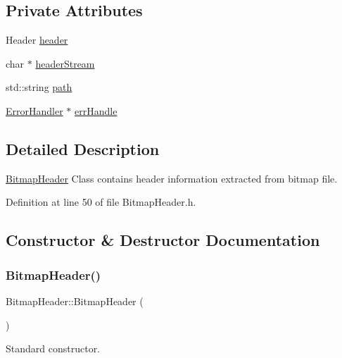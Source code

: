 \subsection*{Private Attributes}
\begin{DoxyCompactItemize}
\item 
Header \mbox{\hyperlink{classBitmapHeader_ab1e2a2c32e87d647977bbd3e700f2265}{header}}
\item 
char $\ast$ \mbox{\hyperlink{classBitmapHeader_a9109a897251733f77942008318482426}{header\+Stream}}
\item 
std\+::string \mbox{\hyperlink{classBitmapHeader_a928111fbaf59eebf24b750cbca11c5dd}{path}}
\item 
\mbox{\hyperlink{classErrorHandler}{Error\+Handler}} $\ast$ \mbox{\hyperlink{classBitmapHeader_ab06f141245d592302dabe48571d12e32}{err\+Handle}}
\end{DoxyCompactItemize}


\subsection{Detailed Description}
\mbox{\hyperlink{classBitmapHeader}{Bitmap\+Header}} Class contains header information extracted from bitmap file. 

Definition at line 50 of file Bitmap\+Header.\+h.



\subsection{Constructor \& Destructor Documentation}
\mbox{\label{classBitmapHeader_a216e4a8485db7865be70c996f37e4c7d}} 
\subsubsection{\texorpdfstring{BitmapHeader()}{BitmapHeader()}\hspace{0.1cm}{\footnotesize\ttfamily [1/4]}}
{\footnotesize\ttfamily Bitmap\+Header\+::\+Bitmap\+Header (\begin{DoxyParamCaption}{ }\end{DoxyParamCaption})}



Standard constructor. 



